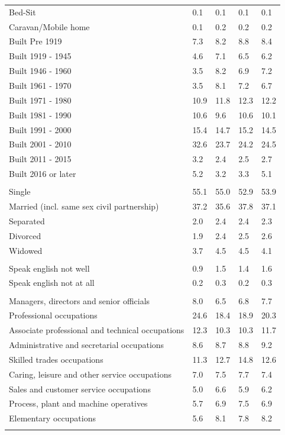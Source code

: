 \documentclass{article}
\begin{document}
\begin{table}[h]
\begin{tabular}{KTTTT}
Bed-Sit & 0.1& 0.1& 0.1& 0.1\\
Caravan/Mobile home & 0.1& 0.2& 0.2& 0.2\\
    \hline
Built Pre 1919 & 7.3& 8.2& 8.8& 8.4\\
Built 1919 - 1945 & 4.6& 7.1& 6.5& 6.2\\
Built  1946 - 1960 & 3.5& 8.2& 6.9& 7.2\\
Built  1961 - 1970 & 3.5& 8.1& 7.2& 6.7\\
Built  1971 - 1980 & 10.9& 11.8& 12.3& 12.2\\
Built  1981 - 1990 & 10.6&  9.6& 10.6& 10.1\\
Built  1991 - 2000 & 15.4& 14.7& 15.2& 14.5\\
Built  2001 - 2010 & 32.6& 23.7& 24.2& 24.5\\
Built  2011 - 2015 & 3.2& 2.4& 2.5& 2.7\\
Built  2016 or later & 5.2& 3.2& 3.3& 5.1\\
\hline
    \\
    \hline
Single & 55.1& 55.0& 52.9& 53.9\\
Married (incl. same sex civil partnership) & 37.2& 35.6& 37.8& 37.1\\
Separated  & 2.0& 2.4& 2.4& 2.3\\
Divorced  & 1.9& 2.4& 2.5& 2.6\\
Widowed & 3.7& 4.5& 4.5& 4.1\\
\hline
    \\ 
    \hline
Speak english not well & 0.9& 1.5& 1.4& 1.6\\
Speak english not at all & 0.2& 0.3& 0.2& 0.3\\
\hline
    \\
    \hline
Managers, directors and senior officials & 8.0& 6.5& 6.8& 7.7\\
Professional occupations & 24.6& 18.4& 18.9& 20.3\\
Associate professional and technical occupations & 12.3& 10.3& 10.3& 11.7\\
Administrative and secretarial occupations & 8.6& 8.7& 8.8& 9.2\\
Skilled trades occupations & 11.3& 12.7& 14.8& 12.6\\
Caring, leisure and other service occupations & 7.0& 7.5& 7.7& 7.4\\
Sales and customer service occupations & 5.0& 6.6& 5.9& 6.2\\
Process, plant and machine operatives & 5.7& 6.9& 7.5& 6.9\\
Elementary occupations & 5.6& 8.1& 7.8& 8.2\\
\hline
\end{tabular}
\end{table}
\end{document}

